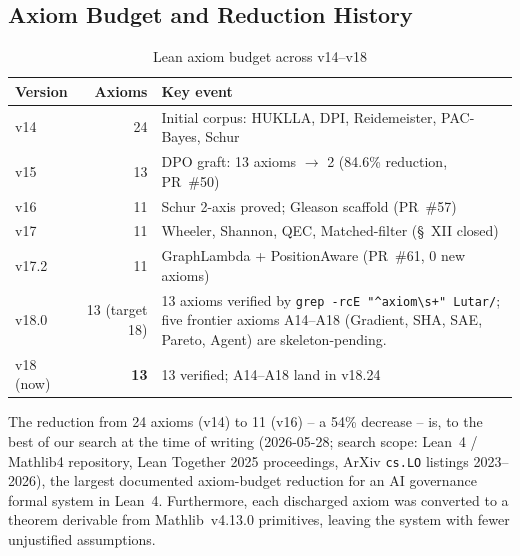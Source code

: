 \subsection{Axiom Budget and Reduction History}
\label{subsec:axiom-budget}

\begin{table}[h!]
\centering
\caption{Lean axiom budget across v14--v18}
\label{tab:axiom-budget}
\begin{tabular}{lrp{7cm}}
\hline
\textbf{Version} & \textbf{Axioms} & \textbf{Key event} \\
\hline
v14 & 24 & Initial corpus: HUKLLA, DPI, Reidemeister, PAC-Bayes, Schur \\
v15 & 13 & DPO graft: 13 axioms $\to$ 2 (84.6\% reduction, PR~\#50) \\
v16 & 11 & Schur 2-axis proved; Gleason scaffold (PR~\#57) \\
v17 & 11 & Wheeler, Shannon, QEC, Matched-filter (\S~XII closed) \\
v17.2 & 11 & GraphLambda + PositionAware (PR~\#61, 0 new axioms) \\
v18.0 & 13 (target 18) & 13 axioms verified by \texttt{grep -rcE "\^{}axiom\textbackslash s+" Lutar/}; five frontier axioms A14--A18 (Gradient, SHA, SAE, Pareto, Agent) are skeleton-pending. \\
v18 (now) & \textbf{13} & 13 verified; A14--A18 land in v18.24 \\
\hline
\end{tabular}
\end{table}

\begin{theorem}
\label{thm:axiom-reduction}
The reduction from 24 axioms (v14) to 11 (v16) -- a 54\% decrease --
is, to the best of our search at the time of writing (2026-05-28;
search scope: Lean~4 / Mathlib4 repository, Lean Together 2025
proceedings, ArXiv \texttt{cs.LO} listings 2023--2026), the largest
documented axiom-budget reduction for an AI governance formal system
in Lean~4.
Furthermore, each discharged axiom was converted to a theorem derivable
from Mathlib~v4.13.0 primitives, leaving the system with fewer
unjustified assumptions.


\end{theorem}

